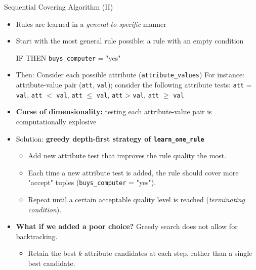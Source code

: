 \begin{frame}{Sequential Covering Algorithm (II)}
	\begin{itemize}
		\item Rules are learned in a \textit{general-to-specific} manner
		\item Start with the most general rule possible: a rule with an empty condition
		      \begin{center}
			      IF THEN \texttt{buys\_computer} = "yes"
		      \end{center}
		\item Then: Consider each possible attribute (\texttt{attribute\_values})\newline
		      For instance: attribute-value pair (\texttt{att}, \texttt{val}); consider the following attribute tests:\newline
		      \texttt{att} = \texttt{val}, \texttt{att} $<$ \texttt{val}, \texttt{att} $\leq$ \texttt{val}, \texttt{att} > \texttt{val}, \texttt{att} $\geq$ \texttt{val}
		\item \textbf{Curse of dimensionality:} testing each attribute-value pair is computationally explosive
		\item Solution: \textbf{greedy depth-first strategy of \texttt{learn\_one\_rule}}
		      \begin{itemize}
			      \item Add new attribute test that improves the rule quality the most.
			      \item Each time a new attribute test is added, the rule should cover more "accept" tuples (\texttt{buys\_computer} = "yes").
			      \item Repeat until a certain acceptable quality level is reached (\textit{terminating condition}).
		      \end{itemize}
		\item \textbf{What if we added a poor choice?} Greedy search does not allow for backtracking.
		      \begin{itemize}
			      \item Retain the best $k$ attribute candidates at each step, rather than a single best candidate.
		      \end{itemize}
	\end{itemize}
\end{frame}

